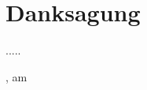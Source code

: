 
\chapter*{Danksagung}

.....

\vspace{1.5cm}

\begin{center}
\raggedleft{\campusAuthor}
\end{center}

\vspace{1.5cm}

\campusCity, am \campusDate
